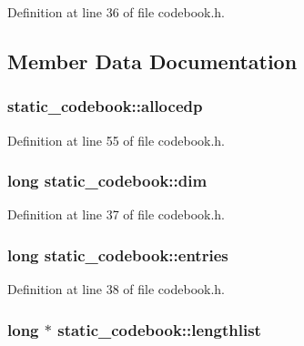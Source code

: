 Definition at line 36 of file codebook.\+h.



\subsection{Member Data Documentation}
\subsubsection[{\texorpdfstring{allocedp}{allocedp}}]{ static\+\_\+codebook\+::allocedp}\hypertarget{structstatic__codebook_a9992fc79beaacce326a6b6cc4b7f0ef9}{}\label{structstatic__codebook_a9992fc79beaacce326a6b6cc4b7f0ef9}


Definition at line 55 of file codebook.\+h.

\subsubsection[{\texorpdfstring{dim}{dim}}]{\setlength{\rightskip}{0pt plus 5cm}long static\+\_\+codebook\+::dim}\hypertarget{structstatic__codebook_ad054a29cfda0a663e6c20c880a247300}{}\label{structstatic__codebook_ad054a29cfda0a663e6c20c880a247300}


Definition at line 37 of file codebook.\+h.

\subsubsection[{\texorpdfstring{entries}{entries}}]{\setlength{\rightskip}{0pt plus 5cm}long static\+\_\+codebook\+::entries}\hypertarget{structstatic__codebook_af672cb700b32f865aa6b3a8807e6bcaf}{}\label{structstatic__codebook_af672cb700b32f865aa6b3a8807e6bcaf}


Definition at line 38 of file codebook.\+h.

\subsubsection[{\texorpdfstring{lengthlist}{lengthlist}}]{\setlength{\rightskip}{0pt plus 5cm}long $\ast$ static\+\_\+codebook\+::lengthlist}\hypertarget{structstatic__codebook_a21d2a561788023117e66d178fd41801b}{}\label{structstatic__codebook_a21d2a561788023117e66d178fd41801b}


